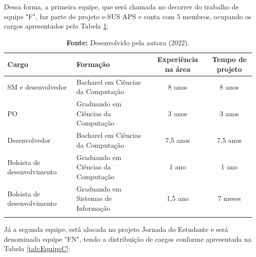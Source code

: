 \documentclass[
    12pt,       %
    openright,      %
    twoside,      %
    a4paper,      %
    english,      %
    french,       %
    spanish,      %
    brazil,       %
    ]{abntex2}
\begin{document}
Dessa forma, a primeira equipe, que será chamada no decorrer do trabalho de equipe "F", faz parte do projeto e-SUS APS e conta com 5 membros, ocupando os cargos apresentados pela Tabela \ref{tab:EquipeF}:

\begin{longtable}{|p{4cm}|p{4cm}|c|c|}
    \caption{Membros da equipe F}
    \label{tab:EquipeF}
    \centering
            \centering
            \hline \rowcolor{lightgray}
            \textbf{Cargo} & \textbf{Formação} & \textbf{Experiência na área} & \textbf{Tempo de projeto} 
            \\ \hline 
            SM e desenvolvedor & Bacharel em Ciências da Computação & 8 anos & 8 anos
            \\ \hline
            PO & Graduando em Ciências da Computação & 3 anos & 3 anos 
            \\ \hline 
            Desenvolvedor & Bacharel em Ciências da Computação & 7,5 anos & 7,5 anos
            \\ \hline 
            Bolsista de desenvolvimento & Graduando em Ciências da Computação & 1 ano & 1 ano
            \\ \hline 
            Bolsista de desenvolvimento & Graduando em Sistemas de Informação & 1,5 ano & 7 meses
            \\ \hline 
            \addlinespace[0.2cm]
            \caption*{\textbf{Fonte:} Desenvolvido pela autora (2022).}
\end{longtable}

Já a segunda equipe, está alocada no projeto Jornada do Estudante e será denominada equipe "FN", tendo a distribuição de cargos conforme apresentada na Tabela \ref{tab:EquipeC}:
\end{document}
